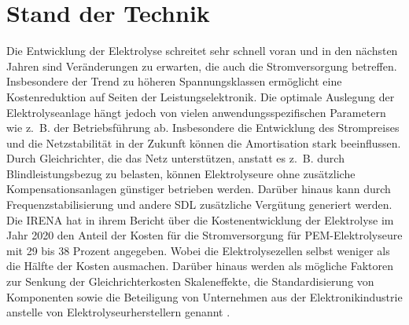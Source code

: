 \section{Stand der Technik}
 Die Entwicklung der Elektrolyse schreitet sehr schnell voran und in den nächsten Jahren sind Veränderungen zu erwarten, die auch die Stromversorgung betreffen. Insbesondere der Trend zu höheren Spannungsklassen ermöglicht eine Kostenreduktion auf Seiten der Leistungselektronik. Die optimale Auslegung der Elektrolyseanlage hängt jedoch von vielen anwendungsspezifischen Parametern wie z.~B. der Betriebsführung ab. Insbesondere die Entwicklung des Strompreises und die Netzstabilität in der Zukunft können die Amortisation stark beeinflussen. Durch Gleichrichter, die das Netz unterstützen, anstatt es z.~B. durch Blindleistungsbezug zu belasten, können Elektrolyseure ohne zusätzliche Kompensationsanlagen günstiger betrieben werden. Darüber hinaus kann durch Frequenzstabilisierung und andere \gls{SDL} zusätzliche Vergütung generiert werden. \\
Die \gls{IRENA} hat in ihrem Bericht über die Kostenentwicklung der Elektrolyse im Jahr 2020 den Anteil der Kosten für die Stromversorgung für \gls{PEM}-Elektrolyseure mit 29 bis 38 Prozent angegeben. Wobei die Elektrolysezellen selbst weniger als die Hälfte der Kosten ausmachen. Darüber hinaus werden als mögliche Faktoren zur Senkung der Gleichrichterkosten Skaleneffekte, die Standardisierung von Komponenten sowie die Beteiligung von Unternehmen aus der Elektronikindustrie anstelle von Elektrolyseurherstellern genannt \cite{IRENA2020}.\\ 
